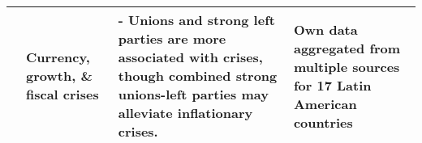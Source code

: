 \begin{tabular}{ m{2.5cm} m{2cm} m{7cm} m{3cm}}
    \cite{Wibbels2010} & Currency, growth, \& fiscal crises & - Unions and strong left parties are more associated with crises, though combined strong unions-left parties may alleviate inflationary crises. & Own data aggregated from multiple sources for 17 Latin American countries \\[0.25cm]\hline


    \hline
\end{tabular}
